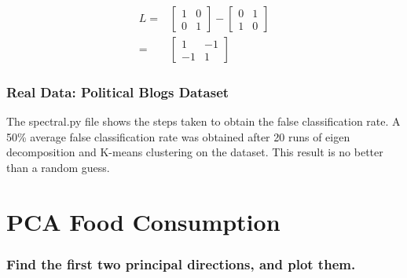 \documentclass[a4paper]{article}
\begin{document}
\begin{align}
L =& 
\begin{bmatrix} 
1 & 0 \\
0 & 1 
\end{bmatrix}
-
\begin{bmatrix} 
0 & 1 \\
1 & 0 
\end{bmatrix}\\
=&
\begin{bmatrix} 
1 & -1 \\
-1 & 1
\end{bmatrix}
\end{align}

\subsubsection{Real Data: Political Blogs Dataset}

The spectral.py file shows the steps taken to obtain the false classification rate.  A 50\%  average false classification rate was obtained after 20 runs of eigen decomposition and K-means clustering on the dataset.  This result is no better than a random guess.   

\section{PCA Food Consumption}
\subsubsection{Find the first two principal directions, and plot them.}





\end{document}
